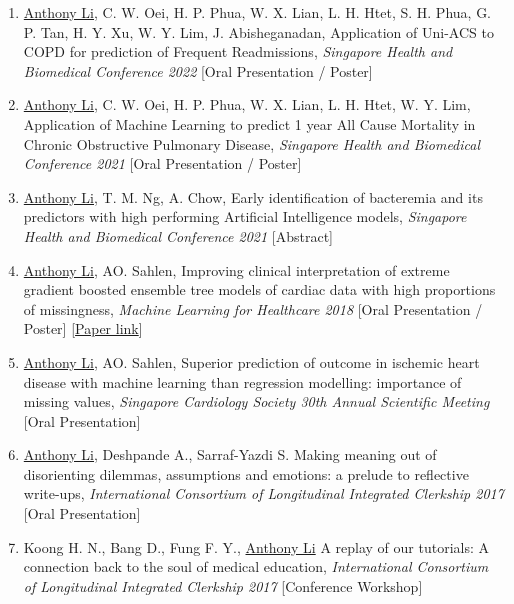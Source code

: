 \documentclass[letterpaper,10pt,oneside]{article}
\begin{document}
\begin{body}
\begin{enumerate}
\item \underline{Anthony Li}, C. W. Oei, H. P. Phua, W. X. Lian, L. H. Htet, S. H. Phua, G. P. Tan, H. Y. Xu, W. Y. Lim, J. Abisheganadan, \textcolor{mygray}{Application of Uni-ACS to COPD for prediction of Frequent Readmissions}, \textit{Singapore Health and Biomedical Conference 2022} [Oral Presentation / Poster]

\item \underline{Anthony Li}, C. W. Oei, H. P. Phua, W. X. Lian, L. H. Htet, W. Y. Lim, \textcolor{mygray}{Application of Machine Learning to predict 1 year All Cause Mortality in Chronic Obstructive Pulmonary Disease}, \textit{Singapore Health and Biomedical Conference 2021} [Oral Presentation / Poster]

\item \underline{Anthony Li}, T. M. Ng, A. Chow, \textcolor{mygray}{Early identification of bacteremia and its predictors with high performing Artificial Intelligence models}, \textit{Singapore Health and Biomedical Conference 2021} [Abstract]

\item \underline{Anthony Li}, AO. Sahlen, \textcolor{mygray}{Improving clinical interpretation of extreme gradient boosted ensemble tree models of cardiac data with high proportions of missingness}, \textit{Machine Learning for Healthcare 2018} [Oral Presentation / Poster] [\href{https://static1.squarespace.com/static/59d5ac1780bd5ef9c396eda6/t/5b737a45032be4fab007b259/1534294605515/Li_A}{Paper link}]

\item \underline{Anthony Li}, AO. Sahlen, \textcolor{mygray}{Superior prediction of outcome in ischemic heart disease with machine learning than regression modelling: importance of missing values}, \textit{Singapore Cardiology Society 30th Annual Scientific Meeting}
[Oral Presentation]

\item \underline{Anthony Li}, Deshpande A., Sarraf-Yazdi S. \textcolor{mygray}{Making meaning out of disorienting dilemmas, assumptions and emotions: a prelude to reflective write-ups}, \textit{International Consortium of Longitudinal Integrated Clerkship 2017}
[Oral Presentation]

\item Koong H. N., Bang D., Fung F. Y., \underline{Anthony Li} \textcolor{mygray}{A replay of our tutorials: A connection back to the soul of medical education}, \textit{International Consortium of Longitudinal Integrated Clerkship 2017}
[Conference Workshop]


\end{enumerate}
\end{body}
\end{document}
